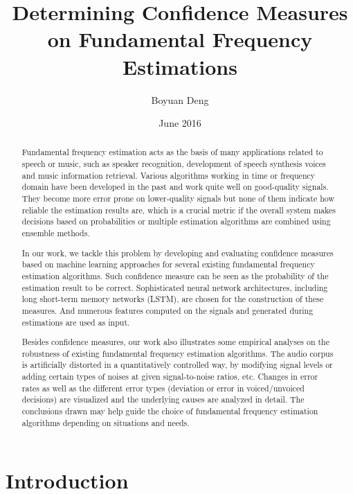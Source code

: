 \documentclass[11pt,a4paper]{report}
\title{Determining Confidence Measures on Fundamental Frequency Estimations}
\author{Boyuan Deng}
\date{June 2016}
\begin{document}
\maketitle



\begin{abstract}
Fundamental frequency estimation acts as the basis of many applications related to speech or music, such as speaker recognition, development of speech synthesis voices and music information retrieval.
Various algorithms working in time or frequency domain have been developed in the past and work quite well on good-quality signals.
They become more error prone on lower-quality signals but none of them indicate how reliable the estimation results are, which is a crucial metric if the overall system makes decisions based on probabilities or multiple estimation algorithms are combined using ensemble methods.

In our work, we tackle this problem by developing and evaluating confidence measures based on machine learning approaches for several existing fundamental frequency estimation algorithms.
Such confidence measure can be seen as the probability of the estimation result to be correct.
Sophisticated neural network architectures, including long short-term memory networks (LSTM), are chosen for the construction of these measures.
And numerous features computed on the signals and generated during estimations are used as input.

Besides confidence measures, our work also illustrates some empirical analyses on the robustness of existing fundamental frequency estimation algorithms.
The audio corpus is artificially distorted in a quantitatively controlled way, by modifying signal levels or adding certain types of noises at given signal-to-noise ratios, etc.
Changes in error rates as well as the different error types (deviation or error in voiced/unvoiced decisions) are visualized and the underlying causes are analyzed in detail.
The conclusions drawn may help guide the choice of fundamental frequency estimation algorithms depending on situations and needs.
\end{abstract}

\tableofcontents

\listoffigures
\listoftables

\chapter{Introduction}
\end{document}
